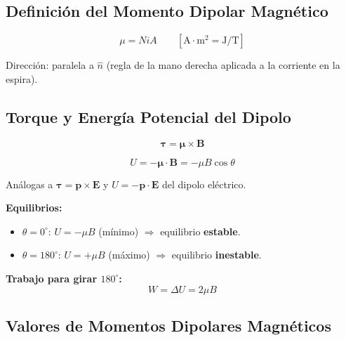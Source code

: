 \documentclass[12pt, letterpaper]{report}
\numberwithin{equation}{section}
\newcommand{\vB}[1]{\boldsymbol{#1}}          %
\begin{document}
\subsection{Definición del Momento Dipolar Magnético}

\begin{equation}
  \boxed{\mu = NiA} \qquad [\mathrm{A\cdot m^2} = \mathrm{J/T}]
  \label{eq:mu}
\end{equation}

Dirección: paralela a $\hat{n}$ (regla de la mano derecha aplicada a la
corriente en la espira).

\subsection{Torque y Energía Potencial del Dipolo}

\begin{equation}
  \boxed{\vB{\tau} = \vB{\mu}\times\vB{B}}
  \label{eq:tau_dipolo}
\end{equation}

\begin{equation}
  \boxed{U = -\vB{\mu}\cdot\vB{B} = -\mu B\cos\theta}
  \label{eq:U_dipolo}
\end{equation}

Análogas a $\vB{\tau}=\vB{p}\times\vB{E}$ y $U=-\vB{p}\cdot\vB{E}$
del dipolo eléctrico.

\textbf{Equilibrios:}
\begin{itemize}[leftmargin=1.8em, itemsep=2pt]
  \item $\theta=0^\circ$: $U=-\mu B$ (mínimo) $\Rightarrow$
        equilibrio \textbf{estable}.
  \item $\theta=180^\circ$: $U=+\mu B$ (máximo) $\Rightarrow$
        equilibrio \textbf{inestable}.
\end{itemize}

\textbf{Trabajo para girar $180^\circ$:}
\[
  W = \Delta U = 2\mu B
\]

\subsection{Valores de Momentos Dipolares Magnéticos}
\end{document}
